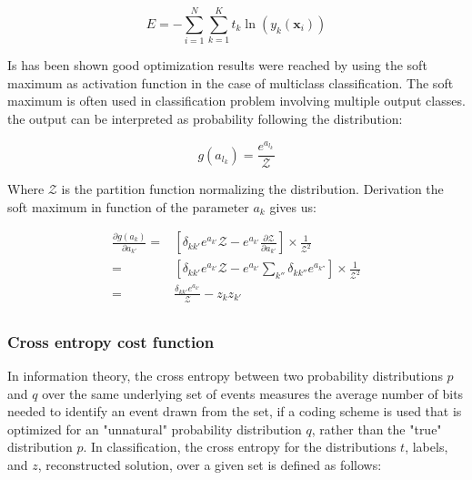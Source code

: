 \documentclass[final, paper=letter,5p,times,twocolumn]{elsarticle}
\begin{document}
\begin{equation}
E = - \sum_{i=1}^{N}\sum_{k=1}^{K} t_{k} \ln (y_{k}(\bm{x}_{i}))
\end{equation}

Is has been shown good optimization results were reached by using the soft maximum as activation function in the case of multiclass classification. The soft maximum is often used in classification problem involving multiple output classes. the output can be interpreted as probability following the distribution:

\begin{equation}
  g(a_{l_{k}}) = \frac{e^{a_{l_{k}}}}{\mathcal{Z}}
  \label{soft_max}
\end{equation}

Where $\mathcal{Z}$ is the partition function normalizing the distribution. Derivation the soft maximum in function of the parameter $a_{k}$ gives us:

\begin{equation*}
  \begin{split}
    \frac{\partial g(a_{k})}{\partial a_{k'}} = & \left \lbrack \delta_{kk'} e^{a_{k'}} \mathcal{Z} - e^{a_{k'}}\frac{\partial \mathcal{Z}}{\partial a_{k'}} \right \rbrack \times \frac{1}{\mathcal{Z}^{2}}\\
    = & \left \lbrack \delta_{kk'} e^{a_{k'}} \mathcal{Z} - e^{a_{k'}} \sum_{k''} \delta_{kk''} e^{a_{k''}}  \right \rbrack \times \frac{1}{\mathcal{Z}^{2}}\\
    = & \frac{\delta_{kk'} e^{a_{k'}}}{\mathcal{Z}} - z_{k}z_{k'}\\
  \end{split}
\end{equation*}


\subsubsection{Cross entropy cost function}
\label{Cross_entropy_cost_function_sec}

In information theory, the cross entropy between two probability distributions $p$ and $q$ over the same underlying set of events measures the average number of bits needed to identify an event drawn from the set, if a coding scheme is used that is optimized for an "unnatural" probability distribution $q$, rather than the "true" distribution $p$. In classification, the cross entropy for the distributions $t$, labels, and $z$, reconstructed solution, over a given set is defined as follows:
\end{document}
